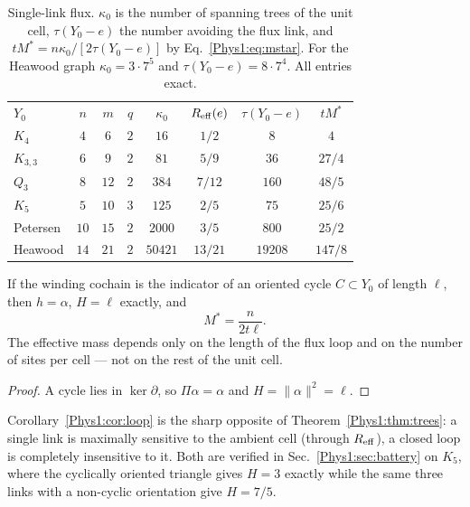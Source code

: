 \begin{table}[t]
\centering
\begin{ruledtabular}
\begin{tabular}{lccccccc}
$Y_0$ & $n$ & $m$ & $q$ & $\kappa_0$ & $R_{\mathrm{eff}}(e)$ & $\tau(Y_0-e)$ & $tM^{*}$\\
\colrule
$K_4$        & $4$  & $6$  & $2$ & $16$    & $1/2$   & $8$     & $4$\\
$K_{3,3}$    & $6$  & $9$  & $2$ & $81$    & $5/9$   & $36$    & $27/4$\\
$Q_3$        & $8$  & $12$ & $2$ & $384$   & $7/12$  & $160$   & $48/5$\\
$K_5$        & $5$  & $10$ & $3$ & $125$   & $2/5$   & $75$    & $25/6$\\
Petersen     & $10$ & $15$ & $2$ & $2000$  & $3/5$   & $800$   & $25/2$\\
Heawood      & $14$ & $21$ & $2$ & $50421$ & $13/21$ & $19208$ & $147/8$\\
\end{tabular}
\end{ruledtabular}
\caption{Single-link flux. $\kappa_0$ is the number of spanning trees of the unit cell,
$\tau(Y_0-e)$ the number avoiding the flux link, and $tM^{*}=n\kappa_0/[2\tau(Y_0-e)]$ by
Eq.~\eqref{Phys1:eq:mstar}. For the Heawood graph $\kappa_0=3\cdot7^{5}$ and
$\tau(Y_0-e)=8\cdot7^{4}$. All entries exact.}
\label{Phys1:tab:trees}
\end{table}

\begin{corollary}\label{Phys1:cor:loop}
If the winding cochain is the indicator of an oriented cycle $C\subset Y_0$ of length
$\ell$, then $h=\alpha$, $H=\ell$ exactly, and
\begin{equation}
M^{*}=\frac{n}{2t\ell} .
\end{equation}
The effective mass depends only on the length of the flux loop and on the number of sites
per cell --- not on the rest of the unit cell.
\end{corollary}

\begin{proof}
A cycle lies in $\ker\partial$, so $\Pi\alpha=\alpha$ and $H=\|\alpha\|^{2}=\ell$.
\end{proof}

Corollary~\ref{Phys1:cor:loop} is the sharp opposite of Theorem~\ref{Phys1:thm:trees}: a single link is
maximally sensitive to the ambient cell (through $R_{\mathrm{eff}}$), a closed loop is completely
insensitive to it. Both are verified in Sec.~\ref{Phys1:sec:battery} on $K_5$, where the
cyclically oriented triangle gives $H=3$ exactly while the same three links with a
non-cyclic orientation give $H=7/5$.

